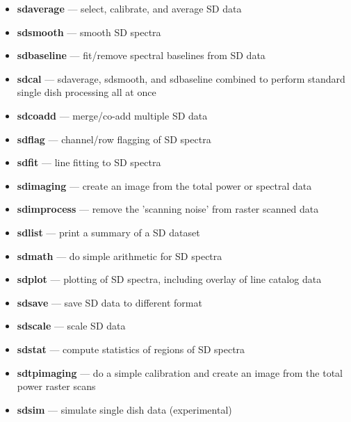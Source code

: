\begin{itemize}

\item {\bf sdaverage} --- select, calibrate, and average SD data

\item {\bf sdsmooth} --- smooth SD spectra

\item {\bf sdbaseline} --- fit/remove spectral baselines from SD data

\item {\bf sdcal} --- sdaverage, sdsmooth, and sdbaseline combined to perform standard single dish processing all at once 

\item {\bf sdcoadd} --- merge/co-add multiple SD data

\item {\bf sdflag} --- channel/row flagging of SD spectra

\item {\bf sdfit} --- line fitting to SD spectra

\item {\bf sdimaging} --- create an image from the total power or spectral data

\item{\bf sdimprocess} --- remove the 'scanning noise' from raster scanned data  

\item {\bf sdlist} --- print a summary of a SD dataset

\item {\bf sdmath} --- do simple arithmetic for SD spectra 

\item {\bf sdplot} --- plotting of SD spectra, including overlay of line
catalog data

\item {\bf sdsave} --- save SD data to different format

\item {\bf sdscale} --- scale SD data
 
\item {\bf sdstat} --- compute statistics of regions of SD spectra

\item {\bf sdtpimaging} --- do a simple calibration and create an image from the total power raster scans
 
\item {\bf sdsim} --- simulate single dish data (experimental)

\end{itemize}

